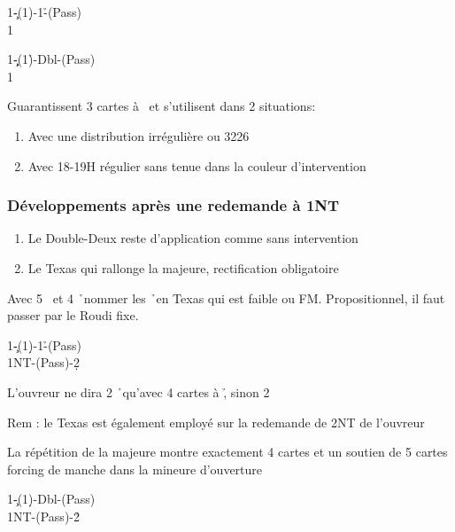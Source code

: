 \documentclass[a4paper]{article}
\begin{document}
\begin{bidtable}
1\c-(1\d)-1\h-(Pass)\\
1\s
\end{bidtable}

\begin{bidtable}
1\c\d-(1\h)-Dbl-(Pass)\\
1\s
\end{bidtable}

Guarantissent 3 cartes à \s\ et s’utilisent dans 2 situations:

\begin{enumerate}
\item Avec une distribution irrégulière ou 3226

\item Avec 18-19H régulier sans tenue dans la couleur d’intervention

\end{enumerate}

\subsubsection{Développements après une redemande à 1NT}

\begin{enumerate}
\item Le Double-Deux reste d’application comme sans intervention

\item Le Texas qui rallonge la majeure, rectification obligatoire

\end{enumerate}

Avec 5 \s\ et 4 \h\ nommer les \h\ en Texas qui est faible ou FM. 
Propositionnel, il faut passer par le Roudi fixe.

\begin{bidtable}
1\c-(1\d)-1\h-(Pass)\\
1NT-(Pass)-2\d
\end{bidtable}

L’ouvreur ne dira 2 \h\ qu’avec 4 cartes à \h , sinon 2 \s 

Rem : le Texas est également employé sur la redemande de 2NT de l’ouvreur

La répétition de la majeure montre exactement 4 cartes et un soutien 
de 5 cartes forcing de manche dans la mineure d’ouverture

\begin{bidtable}
1\c-(1\d)-Dbl-(Pass)\\
1NT-(Pass)-2\h
\end{bidtable}
\end{document}

